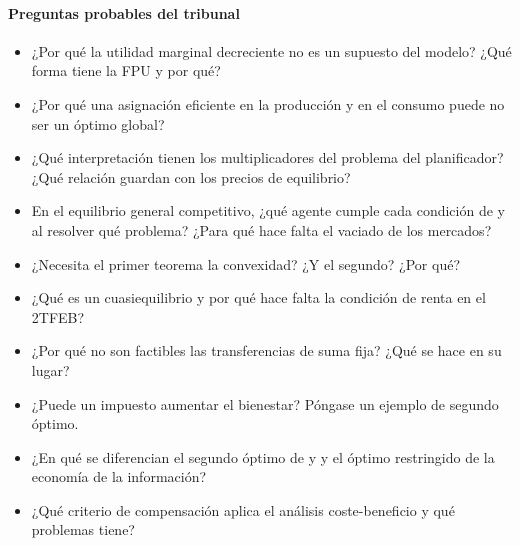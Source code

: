 \documentclass[11pt]{article}
\begin{document}
\paragraph{Preguntas probables del tribunal}

\begin{itemize}
\item ¿Por qué la utilidad marginal decreciente no es un supuesto del modelo? ¿Qué forma tiene la FPU y por qué?
\item ¿Por qué una asignación eficiente en la producción y en el consumo puede no ser un óptimo global?
\item ¿Qué interpretación tienen los multiplicadores del problema del planificador? ¿Qué relación guardan con los precios de equilibrio?
\item En el equilibrio general competitivo, ¿qué agente cumple cada condición de  y al resolver qué problema? ¿Para qué hace falta el vaciado de los mercados?
\item ¿Necesita el primer teorema la convexidad? ¿Y el segundo? ¿Por qué?
\item ¿Qué es un cuasiequilibrio y por qué hace falta la condición de renta en el 2TFEB?
\item ¿Por qué no son factibles las transferencias de suma fija? ¿Qué se hace en su lugar?
\item ¿Puede un impuesto aumentar el bienestar? Póngase un ejemplo de segundo óptimo.
\item ¿En qué se diferencian el segundo óptimo de  y  y el óptimo restringido de la economía de la información?
\item ¿Qué criterio de compensación aplica el análisis coste-beneficio y qué problemas tiene?
\end{itemize}

\nocite{Inman1987Markets}
\bibliografia
\end{document}
